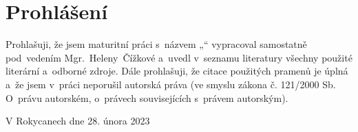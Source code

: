 \vspace*{\fill}

\chapter*{Prohlášení}

\begin{sloppypar}
Prohlašuji, že jsem maturitní práci s~názvem „\thetitle“ vypracoval samostatně pod~vedením \mbox{Mgr. Heleny Čížkové} a~uvedl v~seznamu literatury všechny použité literární a~odborné zdroje. Dále prohlašuji, že citace použitých pramenů je úplná a~že jsem v~práci neporušil autorská práva (ve smyslu zákona č. 121/2000 Sb. O~právu autorském, o~právech souvisejících s~právem autorským).
\end{sloppypar}

V Rokycanech dne 28. února 2023

\vspace*{1.5cm}

\begin{flushright}
    \hspace*{0.5\textwidth}\dotfill
    \\
    \theauthor\hspace*{0.05\textwidth}
\end{flushright}

\vspace*{1cm}
